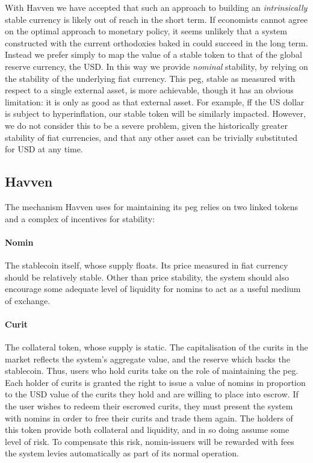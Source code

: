 \noindent With Havven we have accepted that such an approach to building an \textit{intrinsically} stable
currency is likely out of reach in the short term.
If economists cannot agree on the optimal approach to monetary policy, it seems unlikely that a system
constructed with the current orthodoxies baked in could succeed in the long term.
Instead we prefer simply to map the value of a stable token to that of the global reserve currency, the USD.
In this way we provide \textit{nominal} stability, by relying on the stability of the underlying
fiat currency.
This peg, stable as measured with respect to a single external asset, is more achievable, though it has
an obvious limitation: it is only as good as that external asset.
For example, ff the US dollar is subject to hyperinflation, our stable token will be similarly impacted.
However, we do not consider this to be a severe problem, given the historically greater stability of
fiat currencies, and that any other asset can be trivially substituted for USD at any time. \\

\subsection{Havven}
\noindent The mechanism Havven uses for maintaining its peg relies on two linked tokens and a
complex of incentives for stability:

\paragraph{Nomin} The stablecoin itself, whose supply floats. Its price measured in fiat currency should be relatively stable.
Other than price stability, the system should also encourage some adequate level of liquidity for nomins
to act as a useful medium of exchange.

\paragraph{Curit} The collateral token, whose supply is static.
The capitalisation of the curits in the market reflects the system's aggregate value, and the reserve
which backs the stablecoin. Thus, users who hold curits take on the role of maintaining the peg. \\

\noindent Each holder of curits is granted the right to issue a value of nomins in proportion to the USD value
of the curits they hold and are willing to place into escrow. If the user wishes to redeem their escrowed curits, they must
present the system with nomins in order to free their curits and trade them again.
The holders of this token provide both collateral and liquidity, and in so doing assume some
level of risk. To compensate this risk, nomin-issuers will be rewarded with fees the system levies
automatically as part of its normal operation.

